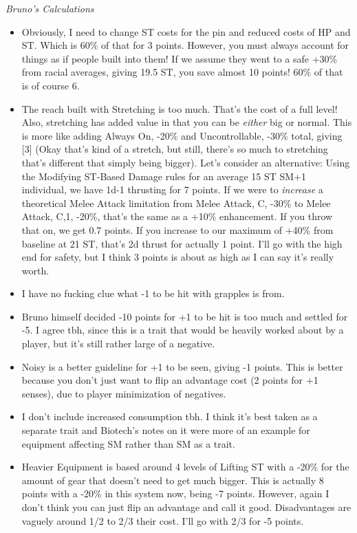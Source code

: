 \begin{multicols*}{2}
	\textit{Bruno's Calculations}
	\begin{itemize}
		\itemsep 0pt
		\item Obviously, I need to change ST costs for the pin and reduced costs of HP and ST. Which is 60\% of that for 3 points. However, you must always account for things as if people built into them! If we assume they went to a safe +30\% from racial averages, giving 19.5 ST, you save almost 10 points! 60\% of that is of course 6.
		\item The reach built with Stretching is too much. That's the cost of a full level! Also, stretching has added value in that you can be \textit{either} big or normal. This is more like adding Always On, -20\% and Uncontrollable, -30\% total, giving [3] (Okay that's kind of a stretch, but still, there's so much to stretching that's different that simply being bigger). Let's consider an alternative: Using the Modifying ST-Based Damage rules for an average 15 ST SM+1 individual, we have 1d-1 thrusting for 7 points. If we were to \textit{increase} a theoretical Melee Attack limitation from Melee Attack, C, -30\% to Melee Attack, C,1, -20\%, that's the same as a +10\% enhancement. If you throw that on, we get 0.7 points. If you increase to our maximum of +40\% from baseline at 21 ST, that's 2d thrust for actually 1 point. I'll go with the high end for safety, but I think 3 points is about as high as I can say it's really worth.
		\item I have no fucking clue what -1 to be hit with grapples is from.
		\item Bruno himself decided -10 points for +1 to be hit is too much and settled for -5. I agree tbh, since this is a trait that would be heavily worked about by a player, but it's still rather large of a negative.
		\item Noisy is a better guideline for +1 to be seen, giving -1 points. This is better because you don't just want to flip an advantage cost (2 points for +1 senses), due to player minimization of negatives.
		\item I don't include increased consumption tbh. I think it's best taken as a separate trait and Biotech's notes on it were more of an example for equipment affecting SM rather than SM as a trait.
		\item Heavier Equipment is based around 4 levels of Lifting ST with a -20\% for the amount of gear that doesn't need to get much bigger. This is actually 8 points with a -20\% in this system now, being -7 points. However, again I don't think you can just flip an advantage and call it good. Disadvantages are vaguely around 1/2 to 2/3 their cost. I'll go with 2/3 for -5 points.

\end{itemize}
\end{multicols*}
